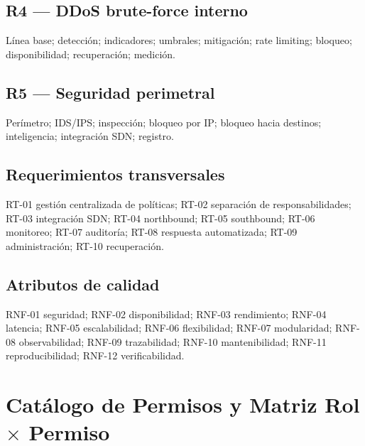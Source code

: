 \documentclass[11pt,a4paper]{report}
\begin{document}
\section{R4 --- DDoS brute-force interno}
Línea base; detección; indicadores; umbrales; mitigación; rate limiting; bloqueo; disponibilidad; recuperación; medición.

\section{R5 --- Seguridad perimetral}
Perímetro; IDS/IPS; inspección; bloqueo por IP; bloqueo hacia destinos; inteligencia; integración SDN; registro.

\section{Requerimientos transversales}
RT-01 gestión centralizada de políticas; RT-02 separación de responsabilidades; RT-03 integración SDN; RT-04 northbound; RT-05 southbound; RT-06 monitoreo; RT-07 auditoría; RT-08 respuesta automatizada; RT-09 administración; RT-10 recuperación.

\section{Atributos de calidad}
RNF-01 seguridad; RNF-02 disponibilidad; RNF-03 rendimiento; RNF-04 latencia; RNF-05 escalabilidad; RNF-06 flexibilidad; RNF-07 modularidad; RNF-08 observabilidad; RNF-09 trazabilidad; RNF-10 mantenibilidad; RNF-11 reproducibilidad; RNF-12 verificabilidad.

\chapter{Catálogo de Permisos y Matriz Rol $\times$ Permiso}
\end{document}
